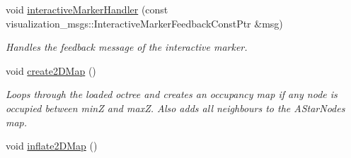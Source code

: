 \begin{DoxyCompactItemize}
void \hyperlink{classSquirrelMotionPlanner_1_1Planner_ab56495a3b985e0f3782eee5a485c7d85}{interactive\-Marker\-Handler} (const visualization\-\_\-msgs\-::\-Interactive\-Marker\-Feedback\-Const\-Ptr \&msg)
\begin{DoxyCompactList}\small\item\em Handles the feedback message of the interactive marker. \end{DoxyCompactList}\item 
\hypertarget{classSquirrelMotionPlanner_1_1Planner_a98216b69fac9035580583ed5842fd4a3}{void \hyperlink{classSquirrelMotionPlanner_1_1Planner_a98216b69fac9035580583ed5842fd4a3}{create2\-D\-Map} ()}\label{classSquirrelMotionPlanner_1_1Planner_a98216b69fac9035580583ed5842fd4a3}

\begin{DoxyCompactList}\small\item\em Loops through the loaded octree and creates an occupancy map if any node is occupied between min\-Z and max\-Z. Also adds all neighbours to the A\-Star\-Nodes map. \end{DoxyCompactList}\item 
\hypertarget{classSquirrelMotionPlanner_1_1Planner_a0c14abeecb551395d123fe494e33f034}{void \hyperlink{classSquirrelMotionPlanner_1_1Planner_a0c14abeecb551395d123fe494e33f034}{inflate2\-D\-Map} ()}\label{classSquirrelMotionPlanner_1_1Planner_a0c14abeecb551395d123fe494e33f034}


\end{DoxyCompactItemize}
